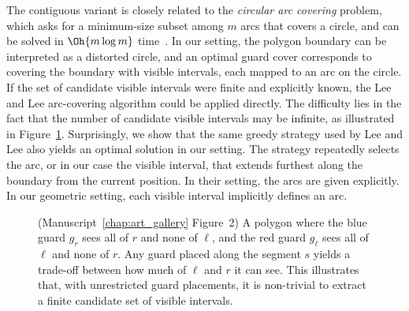 The contiguous variant is closely related to the \emph{circular arc covering} problem, which asks for a minimum-size subset among $m$ arcs that covers a circle, and can be solved in $\Oh{m \log m}$ time~\cite{LEE1984109}. 
In our setting, the polygon boundary can be interpreted as a distorted circle, and an optimal guard cover corresponds to covering the boundary with visible intervals, each mapped to an arc on the circle. 
If the set of candidate visible intervals were finite and explicitly known, the Lee and Lee arc-covering algorithm could be applied directly. 
The difficulty lies in the fact that the number of candidate visible intervals may be infinite, as illustrated in Figure~\ref{fig:CAG_tradeoff_infinite_different}. 
Surprisingly, we show that the same greedy strategy used by Lee and Lee also yields an optimal solution in our setting. 
The strategy repeatedly selects the arc, or in our case the visible interval, that extends furthest along the boundary from the current position. 
In their setting, the arcs are given explicitly. 
In our geometric setting, each visible interval implicitly defines an arc. 

\begin{figure}[ht]
    \centering

    
    \caption{
    (Manuscript~\ref{chap:art_gallery} Figure~2) A polygon where the blue guard $g_r$ sees all of $r$ and none of $\ell$, and the red guard $g_\ell$ sees all of $\ell$ and none of $r$. 
    Any guard placed along the segment $s$ yields a trade-off between how much of $\ell$ and $r$ it can see. 
    This illustrates that, with unrestricted guard placements, it is non-trivial to extract a finite candidate set of visible intervals.
    }
    \label{fig:CAG_tradeoff_infinite_different}
\end{figure}

